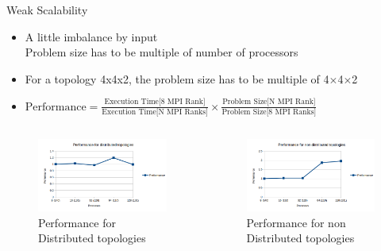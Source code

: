 \documentclass[aspectratio=169]{bredelebeamer}
\begin{document}
\begin{frame}{Weak Scalability}


\begin{itemize}
\item A little imbalance by input\\
Problem size has to be multiple of number of processors\\
\item For a topology 4x4x2, the problem size has to be multiple of 4$\times$4$\times$2 \linebreak 

\item $\text{Performance} = \frac{ \text{Execution Time[8 MPI Rank}]}{\text{Execution Time[N MPI Ranks]} } \times \frac{ \text{Problem Size[N MPI Rank}]}{\text{Problem Size[8 MPI Ranks]} }$ 
\end{itemize}


\begin{columns}

\begin{figure}[h!]
\centering
\includegraphics[width=\textwidth, keepaspectratio=1]{"./img/basic_analysis/performance_distributed"}
\caption*{Performance for Distributed topologies}
\end{figure}

\begin{figure}[h!]
\centering
\includegraphics[width=\textwidth, keepaspectratio=1]{"./img/basic_analysis/performance_nonDistributed"}
\caption*{Performance for non Distributed topologies}
\end{figure}


\end{columns}

\end{frame}
\end{document}
